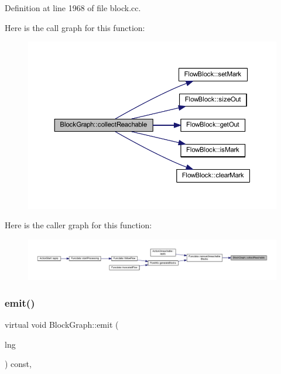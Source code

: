 Definition at line 1968 of file block.\+cc.

Here is the call graph for this function\+:
\nopagebreak
\begin{figure}[H]
\begin{center}
\leavevmode
\includegraphics[width=350pt]{class_block_graph_a48b70c7238548053a1cc3629b8df081b_cgraph}
\end{center}
\end{figure}
Here is the caller graph for this function\+:
\nopagebreak
\begin{figure}[H]
\begin{center}
\leavevmode
\includegraphics[width=350pt]{class_block_graph_a48b70c7238548053a1cc3629b8df081b_icgraph}
\end{center}
\end{figure}
\mbox{\label{class_block_graph_a535d3c7cb13e5e45b6e121b024fa339f}} 
\subsubsection{\texorpdfstring{emit()}{emit()}}
{\footnotesize\ttfamily virtual void Block\+Graph\+::emit (\begin{DoxyParamCaption}\item[{\mbox{\hyperlink{class_print_language}{Print\+Language}} $\ast$}]{lng }\end{DoxyParamCaption}) const\hspace{0.3cm}{\ttfamily [inline]}, {\ttfamily [virtual]}}



